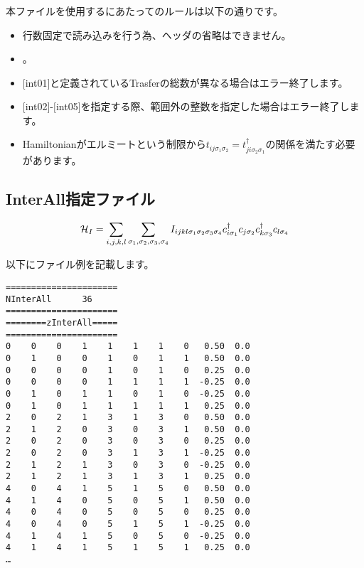 \subsubsection{}
本ファイルを使用するにあたってのルールは以下の通りです。
\begin{itemize}
\item 行数固定で読み込みを行う為、ヘッダの省略はできません。
\item {}。
\item $[$int01$]$と定義されているTrasferの総数が異なる場合はエラー終了します。
\item $[$int02$]$-$[$int05$]$を指定する際、範囲外の整数を指定した場合はエラー終了します。
\item Hamiltonianがエルミートという制限から$t_{ij\sigma_1\sigma_2}=t_{ji\sigma_2\sigma_1}^{\dagger}$の関係を満たす必要があります。
\end{itemize}

\newpage
\subsection{InterAll指定ファイル}
\label{Subsec:interall}
\begin{equation}
{\cal H}_{I}=\sum_{i,j,k,l}\sum_{\sigma_1,\sigma_2, \sigma_3, \sigma_4}
I_{ijkl\sigma_1\sigma_2\sigma_3\sigma_4}c_{i\sigma_1}^{\dagger}c_{j\sigma_2}c_{k\sigma_3}^{\dagger}c_{l\sigma_4}
\end{equation}

以下にファイル例を記載します。\\
\begin{minipage}{12.5cm}
\begin{screen}
\begin{verbatim}
====================== 
NInterAll      36  
====================== 
========zInterAll===== 
====================== 
0    0    0    1    1    1    1    0   0.50  0.0
0    1    0    0    1    0    1    1   0.50  0.0
0    0    0    0    1    0    1    0   0.25  0.0
0    0    0    0    1    1    1    1  -0.25  0.0
0    1    0    1    1    0    1    0  -0.25  0.0
0    1    0    1    1    1    1    1   0.25  0.0
2    0    2    1    3    1    3    0   0.50  0.0
2    1    2    0    3    0    3    1   0.50  0.0
2    0    2    0    3    0    3    0   0.25  0.0
2    0    2    0    3    1    3    1  -0.25  0.0
2    1    2    1    3    0    3    0  -0.25  0.0
2    1    2    1    3    1    3    1   0.25  0.0
4    0    4    1    5    1    5    0   0.50  0.0
4    1    4    0    5    0    5    1   0.50  0.0
4    0    4    0    5    0    5    0   0.25  0.0
4    0    4    0    5    1    5    1  -0.25  0.0
4    1    4    1    5    0    5    0  -0.25  0.0
4    1    4    1    5    1    5    1   0.25  0.0
…
\end{verbatim}
\end{screen}
\end{minipage}

